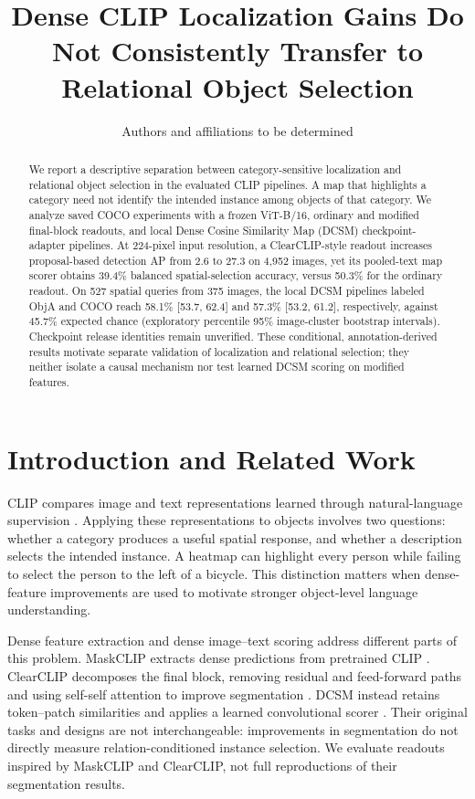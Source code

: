 \documentclass[10pt,twocolumn,letterpaper]{article}
\title{Dense CLIP Localization Gains Do Not Consistently Transfer to Relational Object Selection}
\author{Authors and affiliations to be determined}
\date{}
\begin{document}
\raggedbottom
\maketitle
\begin{abstract}
We report a descriptive separation between category-sensitive
localization and relational object selection in the evaluated CLIP
pipelines. A map that highlights a category need not identify the
intended instance among objects of that category. We analyze saved COCO
experiments with a frozen ViT-B/16, ordinary and modified final-block
readouts, and local Dense Cosine Similarity Map (DCSM)
checkpoint-adapter pipelines. At 224-pixel input resolution, a
ClearCLIP-style readout increases proposal-based detection AP from 2.6
to 27.3 on 4,952 images, yet its pooled-text map scorer obtains 39.4\%
balanced spatial-selection accuracy, versus 50.3\% for the ordinary
readout. On 527 spatial queries from 375 images, the local DCSM
pipelines labeled ObjA and COCO reach 58.1\% {[}53.7, 62.4{]} and 57.3\%
{[}53.2, 61.2{]}, respectively, against 45.7\% expected chance
(exploratory percentile 95\% image-cluster bootstrap intervals).
Checkpoint release identities remain unverified. These conditional,
annotation-derived results motivate separate validation of localization
and relational selection; they neither isolate a causal mechanism nor
test learned DCSM scoring on modified features.
\end{abstract}

\section{Introduction and Related
Work}\label{introduction-and-related-work}

CLIP compares image and text representations learned through
natural-language supervision \citep{radford2021clip}. Applying these
representations to objects involves two questions: whether a category
produces a useful spatial response, and whether a description selects
the intended instance. A heatmap can highlight every person while
failing to select the person to the left of a bicycle. This distinction
matters when dense-feature improvements are used to motivate stronger
object-level language understanding.

Dense feature extraction and dense image--text scoring address different
parts of this problem. MaskCLIP extracts dense predictions from
pretrained CLIP \citep{zhou2021maskclip}. ClearCLIP decomposes the final
block, removing residual and feed-forward paths and using self-self
attention to improve segmentation \citep{lan2024clearclip}. DCSM instead
retains token--patch similarities and applies a learned convolutional
scorer \citep{kang2025dcsm}. Their original tasks and designs are not
interchangeable: improvements in segmentation do not directly measure
relation-conditioned instance selection. We evaluate readouts inspired
by MaskCLIP and ClearCLIP, not full reproductions of their segmentation
results.
\end{document}
